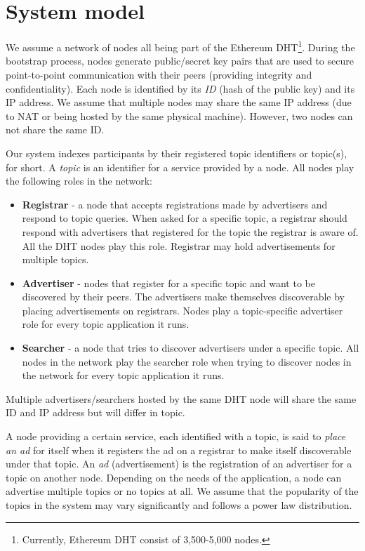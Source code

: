 
\section{System model}
We assume a network of nodes all being part of the Ethereum DHT\footnote{Currently, Ethereum DHT consist of 3,500-5,000 nodes.}. During the bootstrap process, nodes generate public/secret key pairs that are used to secure point-to-point communication with their peers (providing integrity and confidentiality). Each node is identified by its \emph{ID} (hash of the public key) and its IP address. We assume that multiple nodes may share the same IP address (due to NAT or being hosted by the same physical machine). However,  two nodes can not share the same ID.  

Our system indexes participants by their registered topic identifiers or topic(s), for short. 
A \emph{topic} is an identifier for a service provided by a node. 
All nodes play the following roles in the network:

\begin{itemize}
    \item \textbf{Registrar} - a node that accepts registrations made by advertisers and respond to topic queries. When asked for a specific topic, a registrar should respond with advertisers that registered for the topic the registrar is aware of. 
All the DHT nodes play this role. 
Registrar may hold advertisements for multiple topics. 
    \item \textbf{Advertiser} - nodes that register for a specific topic and want to be discovered by their peers. The advertisers make themselves discoverable by placing advertisements on registrars. Nodes play a topic-specific advertiser role for every topic application it runs.
    \item \textbf{Searcher} - a node that tries to discover advertisers under a specific topic. 
All nodes in the network play the searcher role when trying to discover nodes in the network for every topic application it runs.
\end{itemize}

Multiple advertisers/searchers hosted by the same DHT node will share the same ID and IP address but will differ in topic. 

A node providing a certain service,  each identified with a topic,  is said to \emph{place an ad} for itself when it registers the ad on a registrar to make itself discoverable under that topic. 
An \emph{ad} (\ie advertisement) is the registration of an advertiser for a topic on another node. Depending on the needs of the application, a node can advertise multiple topics or no topics at all. 
We assume that the popularity of the topics in the system may vary significantly and follows a power law distribution. 

